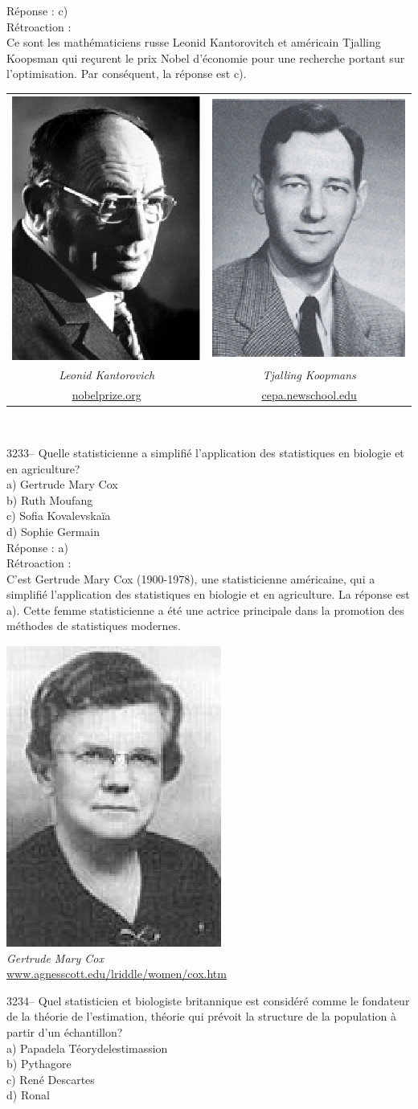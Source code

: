 \documentclass[letterpaper, 12pt]{article}
\begin{document}
R\'eponse : c)\\

R\'etroaction :\\
Ce sont les math\'ematiciens russe Leonid Kantorovitch et am\'ericain Tjalling Koopsman qui re\c curent le prix Nobel d'\'economie pour une recherche portant sur l'optimisation. Par cons\'equent, la r\'eponse est c).
\begin{center}
\begin{tabular}{c c}
\includegraphics[scale=0.5]{kantorovich.eps} & \includegraphics[scale=0.56]{koopmans.eps}\\
\emph{{\small Leonid Kantorovich}} & \emph{{\small Tjalling Koopmans}}\\
\href{http://nobelprize.org/nobel_prizes/economics/laureates/1975/kantorovich-autobio.html}{nobelprize.org} & \href{http://cepa.newschool.edu/het/profiles/koopmans.htm}{cepa.newschool.edu}\\
\end{tabular}\\
\end{center}



3233-- Quelle statisticienne a simplifi\'e l'application des statistiques en biologie et en agriculture?\\

a) Gertrude Mary Cox\\
b) Ruth Moufang\\
c) Sofia Kovalevska\"ia\\
d) Sophie Germain\\

R\'eponse : a)\\

R\'etroaction :\\
C'est Gertrude Mary Cox (1900-1978), une statisticienne am\'ericaine, qui a simplifi\'e l'application des statistiques en biologie et en agriculture. La r\'eponse est a). Cette femme statisticienne a \'et\'e une actrice principale dans la promotion des m\'ethodes de statistiques modernes.
\begin{center}
\includegraphics[scale=0.75]{cox.eps}\\
\emph{{\small Gertrude Mary Cox}}\\
\href{http://www.agnesscott.edu/lriddle/women/cox.htm}{www.agnesscott.edu/lriddle/women/cox.htm}\\[5mm]
\end{center}



3234-- Quel statisticien et biologiste britannique est consid\'er\'e comme le fondateur de la th\'eorie de l'estimation, th\'eorie qui pr\'evoit la structure de la population \`a partir d'un \'echantillon?\\

a) Papadela T\'eorydelestimassion\\
b) Pythagore\\
c) Ren\'e Descartes\\
d) Ronal
\end{document}
